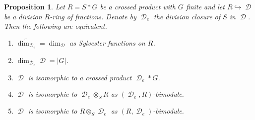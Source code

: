 \documentclass[11pt]{amsart}
\newtheorem{pro}[lem]{Proposition}
\numberwithin{claimcounter}{lem}
\DeclareMathOperator{\D}{\mathcal D}
\begin{document}
\begin{pro}\label{carnatural} Let $R=S*G$ be a crossed product with $G$ finite and let $R\hookrightarrow \D$ be a division  $R$-ring of fractions. Denote by $\D_e$ the division closure of $S$ in $\D$. Then the following are equivalent.

\begin{enumerate}
\item[(a)] $\widetilde{\dim_{\D_e}}=\dim_{\D}$ as Sylvester functions on $R$.
\item [(b)] $\dim_{\D_e} \D= |G|$.
\item[(c)]$\D$ is isomorphic to a crossed product $\D_e*G$.
\item[(d)] $\D$ is isomorphic to $\D_e\otimes_ S R$ as $(\D_e , R)$-bimodule.
\item [(e)]  $\D$ is isomorphic to $R\otimes_ S \D_e$ as $(  R,\D_e)$-bimodule.
\end{enumerate}


\end{pro}
\end{document}
